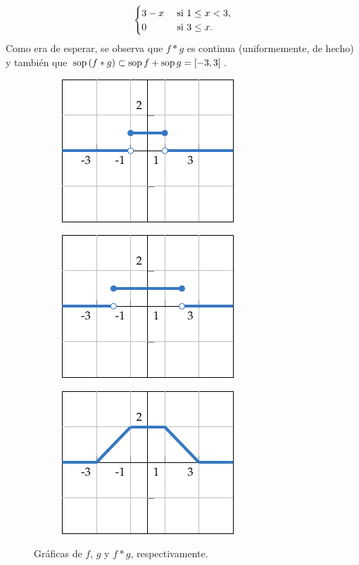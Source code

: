\documentclass[a4paper, 11pt, oneside]{report}
\begin{document}
\begin{example}
\[\begin{cases}
    3-x & $ si $ 1 \leq x < 3, \\
    0 & $ si $ 3 \leq x.
  \end{cases}\]
  Como era de esperar, se observa que $f \ast g$ es continua (uniformemente, de hecho) y también que $\textup{sop}\,(f \ast g) \subset \textup{sop}\, f + \textup{sop}\, g = [-3,3]$.
  \begin{figure}[H]
    \centering
    \begin{subfigure}[b]{0.32\textwidth}
      \centering
      \includegraphics{./plot10/main.pdf}
    \end{subfigure}
    \begin{subfigure}[b]{0.32\textwidth}
      \centering
      \includegraphics{./plot11/main.pdf}
    \end{subfigure}
    \begin{subfigure}[b]{0.32\textwidth}
      \centering
      \includegraphics{./plot9/main.pdf}
    \end{subfigure}
    \caption{Gráficas de $f$, $g$ y $f \ast g$, respectivamente.}
  \end{figure}
\end{example}
\end{document}

